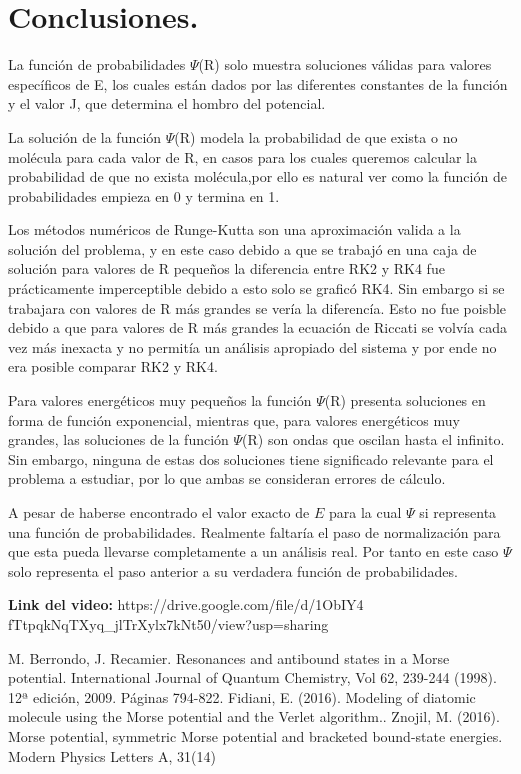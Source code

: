 \documentclass[twocolumn,preprintnumbers,amsmath,amssymb,aps,prl]{revtex4}
\begin{document}
\section{Conclusiones.}
La función de probabilidades $\Psi$(R) solo muestra soluciones válidas para valores específicos de E, los cuales están dados por las diferentes constantes de la función y el valor J, que determina el hombro del potencial.

La solución de la función $\Psi$(R) modela la probabilidad de que exista o no molécula para cada valor de R, en casos para los cuales queremos calcular la probabilidad de que no exista molécula,por ello es natural ver como la función de probabilidades empieza en 0 y termina en 1.

Los métodos numéricos de Runge-Kutta son una aproximación valida a la solución del problema, y en este caso debido a que se trabajó en una caja de solución para valores de R pequeños la diferencia entre RK2 y RK4 fue prácticamente imperceptible debido a esto solo se graficó RK4. Sin embargo si se trabajara con valores de R más grandes se vería la diferencía. Esto no fue poisble debido a que para valores de R más grandes la ecuación de Riccati se volvía cada vez más inexacta y no permitía un análisis apropiado del sistema y por ende no era posible comparar RK2 y RK4.

Para valores energéticos muy pequeños la función $\Psi$(R) presenta soluciones en forma de función exponencial, mientras que, para valores energéticos muy grandes, las soluciones de la función $\Psi$(R) son ondas que oscilan hasta el infinito. Sin embargo, ninguna de estas dos soluciones tiene significado relevante para el problema a estudiar, por lo que ambas se consideran errores de cálculo.

A pesar de haberse encontrado el valor exacto de $E$ para la cual $\Psi$ si representa una función de probabilidades. Realmente faltaría el paso de normalización para que esta pueda llevarse completamente a un análisis real. Por tanto en este caso $\Psi$ solo representa el paso anterior a su verdadera función de probabilidades.

\textbf{Link del video:}
\vspace{0.1}
https://drive.google.com/file/d/1ObIY4
fTtpqkNqTXyq_jlTrXylx7kNt50/view?usp=sharing

\begin{thebibliography}{3}
  M. Berrondo, J. Recamier. Resonances and antibound states in a Morse potential. International Journal of Quantum Chemistry, Vol 62, 239-244 (1998). 12ª edición, 2009. Páginas 794-822.
 Fidiani, E. (2016). Modeling of diatomic molecule using the Morse potential and the Verlet algorithm..
 Znojil, M. (2016). Morse potential, symmetric Morse potential and bracketed bound-state energies. Modern Physics Letters A, 31(14)

\end{thebibliography}
\end{document}
